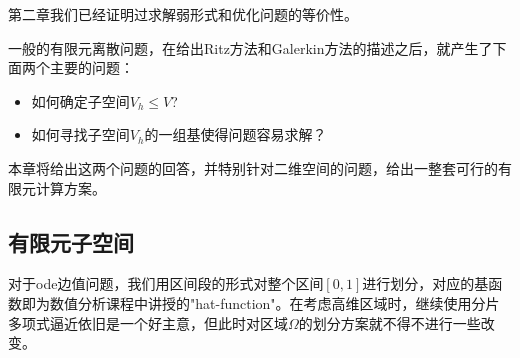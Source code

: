 第二章我们已经证明过求解弱形式和优化问题的等价性。

一般的有限元离散问题，在给出Ritz方法和Galerkin方法的描述之后，就产生了下面两个主要的问题：
\begin{itemize}
    \item 如何确定子空间$V_{h}\le V$?
    \item 如何寻找子空间$V_{h}$的一组基使得问题容易求解？
\end{itemize}
本章将给出这两个问题的回答，并特别针对二维空间的问题，给出一整套可行的有限元计算方案。
\subsection{有限元子空间}
对于ode边值问题，我们用区间段的形式对整个区间$[0,1]$进行划分，对应的基函数即为数值分析课程中讲授的"hat-function"。在考虑高维区域时，继续使用分片多项式逼近依旧是一个好主意，但此时对区域$\Omega$的划分方案就不得不进行一些改变。

